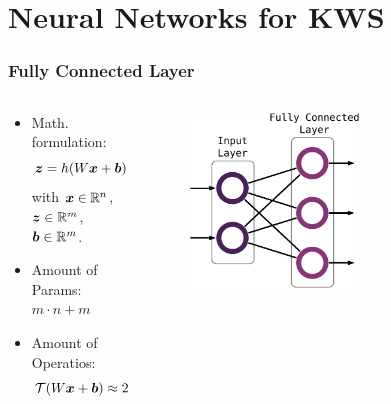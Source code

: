 
\section{Neural Networks for KWS}

\begin{frame}
  \frametitle{Fully Connected Layer}
  \vspace{-0.75cm}
  \begin{columns}
    \begin{column}{0.5\textwidth}
      \begin{itemize}
        \small
        \item Math. formulation:
        \begin{equation*}
          \footnotesize
          \bm{z} = h(W \bm{x} + \bm{b})
        \end{equation*}
        \footnotesize
        with $\bm{x} \in \mathbb{R}^n$, $\bm{z} \in \mathbb{R}^m$, $\bm{b} \in \mathbb{R}^m$.
        \small
        \vspace{0.2cm}
        \item Amount of Params: 
        \footnotesize 
        $m \cdot n + m$
        \small
        \vspace{0.2cm}
        \item Amount of Operatios:
        \begin{equation*}
          \footnotesize
          \mathcal{T}(W \bm{x} + \bm{b}) \approx 2 (m \cdot n) + m
        \end{equation*}     
      \end{itemize}
    \end{column}
    \begin{column}{0.5\textwidth}
      \vspace{0.75cm}
      \centering
      \begin{figure} \includegraphics[width=0.6\textwidth]{../4_nn/figs/nn_theory_fc.pdf} \end{figure}
      \vfill
    \end{column}
  \end{columns}
\end{frame}

